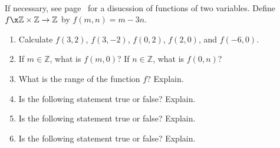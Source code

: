 \begin{previewactivity}  \label{PA:functionoftwovars} \hfill \\
If necessary, see page~\pageref{ss:functiontwovar} for a disucssion of functions of two variables.
Define  $f\x \mathbb{Z} \times \mathbb{Z} \to \mathbb{Z}$ by  $f( {m, n} ) = m - 3n$.


\begin{enumerate}
\item Calculate  $f( {3, 2} )$, $f( {3,  - 2} )$, 
$f( {0, 2} )$, $f( {2, 0} )$, and  $f( { - 6, 0} )$.

\item If  $m \in \mathbb{Z}$, what is  $f( {m, 0} )$?  If  $n \in \mathbb{Z}$, what is  $f( {0, n} )$?

\item What is the range of the function  $f$?  Explain. 

\item Is the following statement true or false?  Explain.


\item Is the following statement true or false?  Explain.


\item Is the following statement true or false?  Explain.

\end{enumerate}
\end{previewactivity}
\hbreak

\endinput

